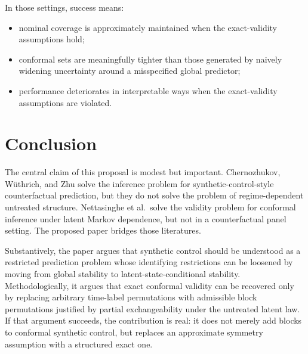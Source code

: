 \documentclass[11pt]{article}
\begin{document}
In those settings, success means:
\begin{itemize}
    \item nominal coverage is approximately maintained when the exact-validity assumptions hold;
    \item conformal sets are meaningfully tighter than those generated by naively widening uncertainty around a misspecified global predictor;
    \item performance deteriorates in interpretable ways when the exact-validity assumptions are violated.
\end{itemize}

\section{Conclusion}

The central claim of this proposal is modest but important. Chernozhukov, W\"uthrich, and Zhu solve the inference problem for synthetic-control-style counterfactual prediction, but they do not solve the problem of regime-dependent untreated structure. Nettasinghe et al.\ solve the validity problem for conformal inference under latent Markov dependence, but not in a counterfactual panel setting. The proposed paper bridges those literatures.

Substantively, the paper argues that synthetic control should be understood as a restricted prediction problem whose identifying restrictions can be loosened by moving from global stability to latent-state-conditional stability. Methodologically, it argues that exact conformal validity can be recovered only by replacing arbitrary time-label permutations with admissible block permutations justified by partial exchangeability under the untreated latent law. If that argument succeeds, the contribution is real: it does not merely add blocks to conformal synthetic control, but replaces an approximate symmetry assumption with a structured exact one.
\end{document}
